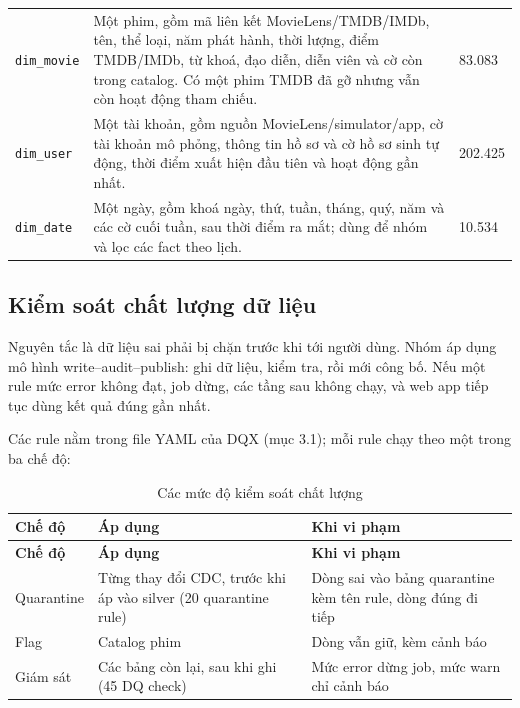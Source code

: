 \documentclass[a4paper,11pt]{article}
\newlength{\reporttablewidth}
\newcommand{\dbsep}{\_\allowbreak}
\begin{document}
\begin{longtable}{@{}L{0.26\reporttablewidth} L{0.44\reporttablewidth} L{0.30\reporttablewidth}@{}}
\texttt{dim\dbsep{}movie} & Một phim, gồm mã liên kết MovieLens/TMDB/IMDb, tên, thể loại, năm phát hành, thời lượng, điểm TMDB/IMDb, từ khoá, đạo diễn, diễn viên và cờ còn trong catalog. Có một phim TMDB đã gỡ nhưng vẫn còn hoạt động tham chiếu. & 83.083 \\
\texttt{dim\dbsep{}user} & Một tài khoản, gồm nguồn MovieLens/simulator/app, cờ tài khoản mô phỏng, thông tin hồ sơ và cờ hồ sơ sinh tự động, thời điểm xuất hiện đầu tiên và hoạt động gần nhất. & 202.425 \\
\texttt{dim\dbsep{}date} & Một ngày, gồm khoá ngày, thứ, tuần, tháng, quý, năm và các cờ cuối tuần, sau thời điểm ra mắt; dùng để nhóm và lọc các fact theo lịch. & 10.534 \\
\end{longtable}
\endgroup

\subsection{Kiểm soát chất lượng dữ liệu}\label{sec:3.5}

Nguyên tắc là dữ liệu sai phải bị chặn trước khi tới người dùng. Nhóm áp dụng mô hình write--audit--publish: ghi dữ liệu, kiểm tra, rồi mới công bố. Nếu một rule mức error không đạt, job dừng, các tầng sau không chạy, và web app tiếp tục dùng kết quả đúng gần nhất.

Các rule nằm trong file YAML của DQX (mục 3.1); mỗi rule chạy theo một trong ba chế độ:

\begingroup
\small
{}
\setlength{\tabcolsep}{4pt}
\renewcommand{\arraystretch}{1.18}
\setlength{\reporttablewidth}{\dimexpr\linewidth-4\tabcolsep\relax}
\begin{longtable}{@{}L{0.20\reporttablewidth} L{0.39\reporttablewidth} L{0.41\reporttablewidth}@{}}
\caption[Các mức độ kiểm soát chất lượng (mục 3.5)]{Các mức độ kiểm soát chất lượng}\label{tab:12} \\
\toprule
\textbf{Chế độ} & \textbf{Áp dụng} & \textbf{Khi vi phạm} \\
\midrule
\endfirsthead
\toprule
\textbf{Chế độ} & \textbf{Áp dụng} & \textbf{Khi vi phạm} \\
\midrule
\endhead
\midrule
\endfoot
\bottomrule
\endlastfoot
Quarantine & Từng thay đổi CDC, trước khi áp vào silver (20 quarantine rule) & Dòng sai vào bảng quarantine kèm tên rule, dòng đúng đi tiếp \\
Flag & Catalog phim & Dòng vẫn giữ, kèm cảnh báo \\
Giám sát & Các bảng còn lại, sau khi ghi (45 DQ check) & Mức error dừng job, mức warn chỉ cảnh báo \\
\end{longtable}
\endgroup
\end{document}
